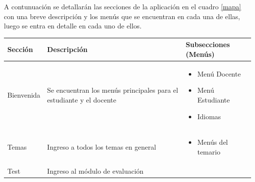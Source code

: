 \documentclass[letterpaper, 11pt, oneside]{article}
\theoremstyle{definition}
\theoremstyle{remark}
\begin{document}
A contunuación se detallarán las secciones de la aplicación en el cuadro \ref{mapa} con una breve descripción y los menús que se encuentran en cada una de ellas, luego se entra en detalle en cada uno de ellos.

 \begin{table}[h]
\centering
\begin{tabular}[htb]{ p{2cm} | p{3.5cm} | p{6.5cm} }
\toprule
\rowcolor[gray]{0.9}Sección & Descripción & Subsecciones (Menús) \\
\midrule
  Bienvenida & Se encuentran los menús principales para el estudiante y el docente  & \begin{itemize}[itemsep=0pt,topsep=-5pt]                                                                                                                                                                                                                                                                                                                                                                                          
\item Menú Docente                                                                                                                                                                                                                                                                                                                                                                                              
\item Menú Estudiante
\item Idiomas
 \end{itemize}
 \\
\midrule
 Temas & Ingreso a todos los temas en general  & \begin{itemize}[itemsep=0pt,topsep=-5pt] \item Menús del temario  \end{itemize} \\
\midrule
 Test & Ingreso al módulo de evaluación &  \begin{itemize}[itemsep=0pt,topsep=-5pt]                                                                                                                                                                                                                                                                                                                                                                                                

\end{itemize}
\end{tabular}
\end{table}
\end{document}
